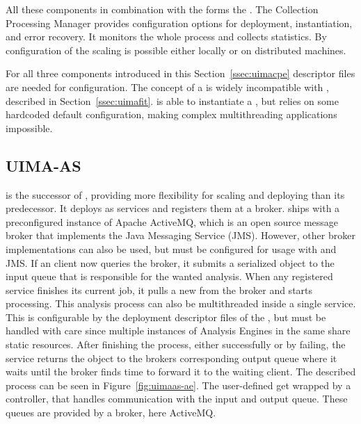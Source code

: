 All these components in combination with the \uima{} \cpm{} forms the \uimacpe{}. The Collection Processing Manager provides configuration options for deployment, instantiation, and error recovery. It monitors the whole process and collects statistics. By configuration of the \cpm{} scaling is possible either locally or on distributed machines.

For all three components introduced in this Section~\ref{ssec:uimacpe} \xml{} descriptor files are needed for configuration. The concept of a \uimacpe{} is widely incompatible with \uimafit{}, described in Section~\ref{ssec:uimafit}. \uimafit{} is able to instantiate a \cpe{}, but relies on some hardcoded default configuration, making complex multithreading applications impossible.


\subsection{UIMA-AS}
\label{ssec:uimaas}
\uimaas{} is the successor of \uimacpe{}, providing more flexibility for scaling and deploying than its predecessor. It deploys \anens{} as services and registers them at a broker. \uimaas{} ships with a preconfigured instance of Apache ActiveMQ, which is an open source message broker that implements the Java Messaging Service (JMS). However, other broker implementations can also be used, but must be configured for usage with \uimaas{} and JMS. If an \uimaas{} client now queries the broker, it submits a serialized \cas{} object to the input queue that is responsible for the wanted analysis. When any registered service finishes its current job, it pulls a new \cas{} from the broker and starts processing. This analysis process can also be multithreaded inside a single service. This is configurable by the deployment \xml{} descriptor files of the \anens{}, but must be handled with care since multiple instances of Analysis Engines in the same \jvm{} share static resources. After finishing the process, either successfully or by failing, the service returns the \cas{} object to the brokers corresponding output queue where it waits until the broker finds time to forward it to the waiting client. The described process can be seen in Figure~\ref{fig:uimaas-ae}. The user-defined \anen{} get wrapped by a \uimaas{} controller, that handles communication with the input and output queue. These queues are provided by a broker, here ActiveMQ.

